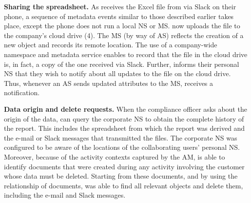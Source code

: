 
\noindent\textbf{Sharing the spreadsheet.}
As \persc  receives the Excel file from \persa via Slack on their phone, a
sequence of metadata events similar to those described earlier takes place,
except the phone does not run a local NS or MS. \persc now uploads the file to
the company's cloud drive (4). The MS (by way of AS) reflects the creation of a
new object and records its remote location. The use of a company-wide namespace
and metadata service enables \emph{\system} to record that the file in the cloud drive
is, in fact, a copy of the one received via Slack.  Further, \persc informs
their personal NS that they wish to notify \persa about all updates to the file
on the cloud drive. Thus, whenever an AS sends updated attributes to the MS,
\persc receives a notification.


\noindent\textbf{Data origin and delete requests.}
When the compliance officer asks about the origin of the data, \persc can query
the corporate NS to obtain the complete history of the report. This includes the
spreadsheet from which the report was derived and the e-mail or Slack messages
that transmitted the files.
The corporate NS was configured to be aware of the locations of the
collaborating users' personal NS. Moreover, because of the activity contexts
captured by the AM, \emph{\system} is able to identify documents that were created
during any activity involving the customer whose data must be deleted. Starting
from these documents, and by using the relationship of documents, \persb was
able to find all relevant objects and delete them, including the e-mail and
Slack messages.


